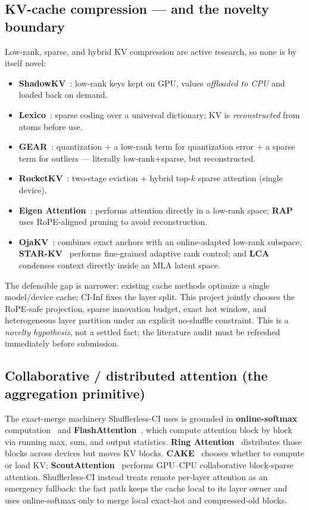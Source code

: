 \documentclass[11pt]{article}
\newcommand{\term}[1]{\textbf{\color{accent!85!black}#1}}
\begin{document}
\subsection{KV-cache compression --- and the novelty boundary}
Low-rank, sparse, and hybrid KV compression are active research, so none is by itself novel:
\begin{itemize}[leftmargin=1.5em,itemsep=1pt]
\item \term{ShadowKV}~\cite{shadowkv}: low-rank keys kept on GPU, values \emph{offloaded to CPU}
and loaded back on demand.
\item \term{Lexico}~\cite{lexico}: sparse coding over a universal dictionary; KV is
\emph{reconstructed} from atoms before use.
\item \term{GEAR}~\cite{gear}: quantization $+$ a low-rank term for quantization error $+$ a
sparse term for outliers --- literally low-rank$+$sparse, but reconstructed.
\item \term{RocketKV}~\cite{rocketkv}: two-stage eviction $+$ hybrid top-$k$ sparse attention
(single device).
\item \term{Eigen Attention}~\cite{eigenattention}: performs attention directly in a
low-rank space; \term{RAP}~\cite{rap} uses RoPE-aligned pruning to avoid reconstruction.
\item \term{OjaKV}~\cite{ojakv}: combines exact anchors with an online-adapted low-rank
subspace; \term{STAR-KV}~\cite{starkv} performs fine-grained adaptive rank control; and
\term{LCA}~\cite{lca} condenses context directly inside an MLA latent space.
\end{itemize}
The defensible gap is narrower: existing cache methods optimize a single model/device cache;
CI-Inf fixes the layer split. This project jointly chooses the RoPE-safe projection, sparse
innovation budget, exact hot window, and heterogeneous layer partition under an explicit
no-shuffle constraint. This is a \emph{novelty hypothesis}, not a settled fact; the literature
audit must be refreshed immediately before submission.

\subsection{Collaborative / distributed attention (the aggregation primitive)}
The exact-merge machinery Shufflerless-CI uses is grounded in \term{online-softmax}
computation~\cite{onlinesoftmax} and \term{FlashAttention}~\cite{flashattention}, which compute
attention block by block via running max, sum, and output statistics.
\term{Ring Attention}~\cite{ringattention} distributes those blocks across devices but moves
KV blocks. \term{CAKE}~\cite{cake} chooses whether to compute or load KV;
\term{ScoutAttention}~\cite{scoutattention} performs GPU--CPU collaborative block-sparse
attention. Shufflerless-CI instead treats remote per-layer attention as an emergency fallback:
the fast path keeps the cache local to its layer owner and uses online-softmax only to merge
local exact-hot and compressed-old blocks.
\end{document}
